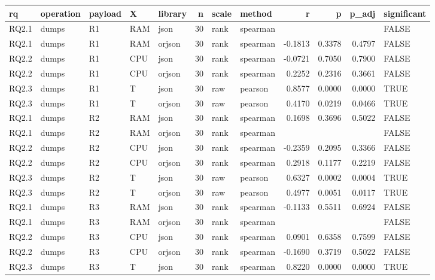 \begin{table}[ht]
\centering
\begin{tabular}{lllllrllrrrl}
  \toprule
rq & operation & payload & X & library & n & scale & method & r & p & p\_adj & significant \\ 
  \midrule
RQ2.1 & dumps & R1 & RAM & json &    30 & rank & spearman &  &  &  & FALSE \\ 
  RQ2.1 & dumps & R1 & RAM & orjson &    30 & rank & spearman & -0.1813 & 0.3378 & 0.4797 & FALSE \\ 
  RQ2.2 & dumps & R1 & CPU & json &    30 & rank & spearman & -0.0721 & 0.7050 & 0.7900 & FALSE \\ 
  RQ2.2 & dumps & R1 & CPU & orjson &    30 & rank & spearman & 0.2252 & 0.2316 & 0.3661 & FALSE \\ 
  RQ2.3 & dumps & R1 & T & json &    30 & raw & pearson & 0.8577 & 0.0000 & 0.0000 & TRUE \\ 
  RQ2.3 & dumps & R1 & T & orjson &    30 & raw & pearson & 0.4170 & 0.0219 & 0.0466 & TRUE \\ 
  RQ2.1 & dumps & R2 & RAM & json &    30 & rank & spearman & 0.1698 & 0.3696 & 0.5022 & FALSE \\ 
  RQ2.1 & dumps & R2 & RAM & orjson &    30 & rank & spearman &  &  &  & FALSE \\ 
  RQ2.2 & dumps & R2 & CPU & json &    30 & rank & spearman & -0.2359 & 0.2095 & 0.3366 & FALSE \\ 
  RQ2.2 & dumps & R2 & CPU & orjson &    30 & rank & spearman & 0.2918 & 0.1177 & 0.2219 & FALSE \\ 
  RQ2.3 & dumps & R2 & T & json &    30 & raw & pearson & 0.6327 & 0.0002 & 0.0004 & TRUE \\ 
  RQ2.3 & dumps & R2 & T & orjson &    30 & raw & pearson & 0.4977 & 0.0051 & 0.0117 & TRUE \\ 
  RQ2.1 & dumps & R3 & RAM & json &    30 & rank & spearman & -0.1133 & 0.5511 & 0.6924 & FALSE \\ 
  RQ2.1 & dumps & R3 & RAM & orjson &    30 & rank & spearman &  &  &  & FALSE \\ 
  RQ2.2 & dumps & R3 & CPU & json &    30 & rank & spearman & 0.0901 & 0.6358 & 0.7599 & FALSE \\ 
  RQ2.2 & dumps & R3 & CPU & orjson &    30 & rank & spearman & -0.1690 & 0.3719 & 0.5022 & FALSE \\ 
  RQ2.3 & dumps & R3 & T & json &    30 & rank & spearman & 0.8220 & 0.0000 & 0.0000 & TRUE \\ 

\end{tabular}
\end{table}
